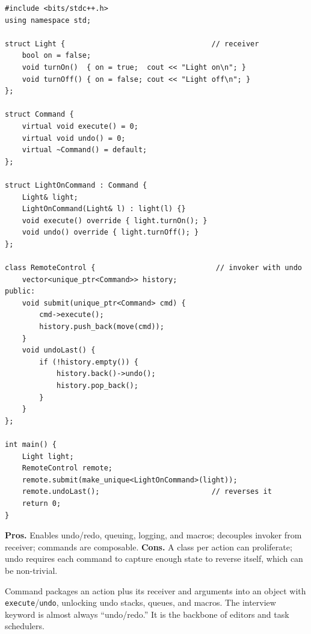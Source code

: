 \begin{lstlisting}
#include <bits/stdc++.h>
using namespace std;

struct Light {                                  // receiver
    bool on = false;
    void turnOn()  { on = true;  cout << "Light on\n"; }
    void turnOff() { on = false; cout << "Light off\n"; }
};

struct Command {
    virtual void execute() = 0;
    virtual void undo() = 0;
    virtual ~Command() = default;
};

struct LightOnCommand : Command {
    Light& light;
    LightOnCommand(Light& l) : light(l) {}
    void execute() override { light.turnOn(); }
    void undo() override { light.turnOff(); }
};

class RemoteControl {                            // invoker with undo
    vector<unique_ptr<Command>> history;
public:
    void submit(unique_ptr<Command> cmd) {
        cmd->execute();
        history.push_back(move(cmd));
    }
    void undoLast() {
        if (!history.empty()) {
            history.back()->undo();
            history.pop_back();
        }
    }
};

int main() {
    Light light;
    RemoteControl remote;
    remote.submit(make_unique<LightOnCommand>(light));
    remote.undoLast();                          // reverses it
    return 0;
}
\end{lstlisting}

\begin{complexitybox}
\textbf{Pros.} Enables undo/redo, queuing, logging, and macros; decouples
invoker from receiver; commands are composable. \textbf{Cons.} A class per
action can proliferate; undo requires each command to capture enough state
to reverse itself, which can be non-trivial.
\end{complexitybox}

\begin{takeawaybox}
Command packages an action plus its receiver and arguments into an object
with \texttt{execute}/\texttt{undo}, unlocking undo stacks, queues, and
macros. The interview keyword is almost always ``undo/redo.'' It is the
backbone of editors and task schedulers.
\end{takeawaybox}
